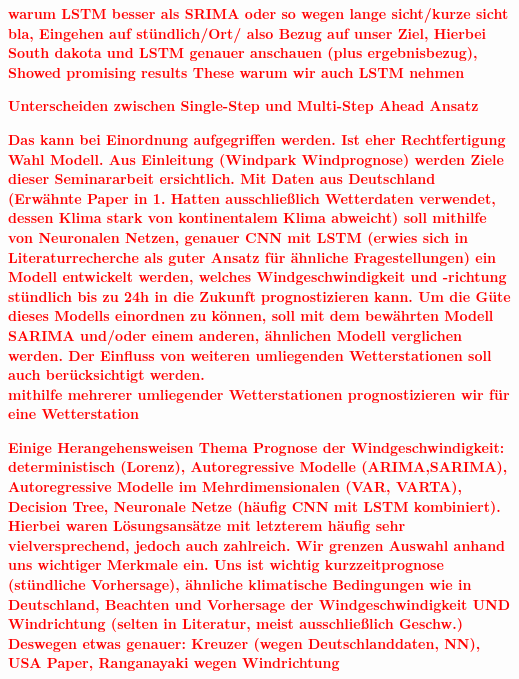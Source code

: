 \documentclass[
12pt, %
toc=listofnumbered, %
toc=chapterentrydotfill, %
numbers=noenddot, %
captions=tableheading, %
bibliography=numbered
]{scrreprt}
\newcommand{\highlight}[1]{\textbf{\textcolor{red}{#1}}}
\begin{document}
\highlight{warum LSTM besser als SRIMA oder so wegen lange sicht/kurze sicht bla, Eingehen auf stündlich/Ort/ also Bezug auf 
unser Ziel, Hierbei South dakota und LSTM genauer anschauen (plus ergebnisbezug), Showed promising results These warum wir auch 
LSTM nehmen}

\highlight{Unterscheiden zwischen Single-Step und Multi-Step Ahead Ansatz}

\highlight{ Das kann bei Einordnung aufgegriffen werden. Ist eher Rechtfertigung Wahl Modell.
	Aus Einleitung (Windpark Windprognose) werden Ziele dieser Seminararbeit ersichtlich. 
Mit Daten aus Deutschland (Erwähnte Paper in 1. Hatten ausschließlich Wetterdaten verwendet, dessen Klima stark von kontinentalem Klima abweicht) 
soll mithilfe von Neuronalen Netzen, genauer CNN mit LSTM (erwies sich in Literaturrecherche als guter Ansatz für ähnliche Fragestellungen) ein 
Modell entwickelt werden, welches Windgeschwindigkeit und -richtung stündlich bis zu 24h in die Zukunft prognostizieren kann. 
Um die Güte dieses Modells einordnen zu können, soll mit dem bewährten Modell SARIMA und/oder einem anderen, ähnlichen Modell verglichen werden. 
Der Einfluss von weiteren umliegenden Wetterstationen soll auch berücksichtigt werden.} \\

\highlight{mithilfe mehrerer umliegender Wetterstationen prognostizieren wir für eine Wetterstation}

\highlight{Einige Herangehensweisen Thema Prognose der Windgeschwindigkeit: 
deterministisch (Lorenz), Autoregressive Modelle (ARIMA,SARIMA), Autoregressive Modelle im Mehrdimensionalen (VAR, VARTA), 
Decision Tree,  Neuronale Netze (häufig CNN mit LSTM kombiniert). 
Hierbei waren Lösungsansätze mit letzterem häufig sehr vielversprechend, jedoch auch zahlreich.
Wir grenzen Auswahl anhand uns wichtiger Merkmale ein. 
Uns ist wichtig kurzzeitprognose (stündliche Vorhersage), ähnliche klimatische Bedingungen wie in Deutschland, Beachten und Vorhersage der Windgeschwindigkeit UND Windrichtung (selten in Literatur, meist ausschließlich Geschw.) 
Deswegen etwas genauer: Kreuzer (wegen Deutschlanddaten, NN), USA Paper, Ranganayaki wegen Windrichtung
}



\end{document}
